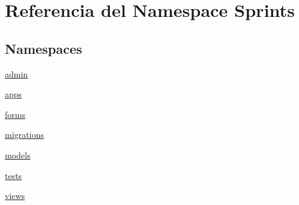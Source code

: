 \hypertarget{namespace_sprints}{}\section{Referencia del Namespace Sprints}
\label{namespace_sprints}
\subsection*{Namespaces}
\begin{DoxyCompactItemize}
\item 
 \hyperlink{namespace_sprints_1_1admin}{admin}
\item 
 \hyperlink{namespace_sprints_1_1apps}{apps}
\item 
 \hyperlink{namespace_sprints_1_1forms}{forms}
\item 
 \hyperlink{namespace_sprints_1_1migrations}{migrations}
\item 
 \hyperlink{namespace_sprints_1_1models}{models}
\item 
 \hyperlink{namespace_sprints_1_1tests}{tests}
\item 
 \hyperlink{namespace_sprints_1_1views}{views}
\end{DoxyCompactItemize}

